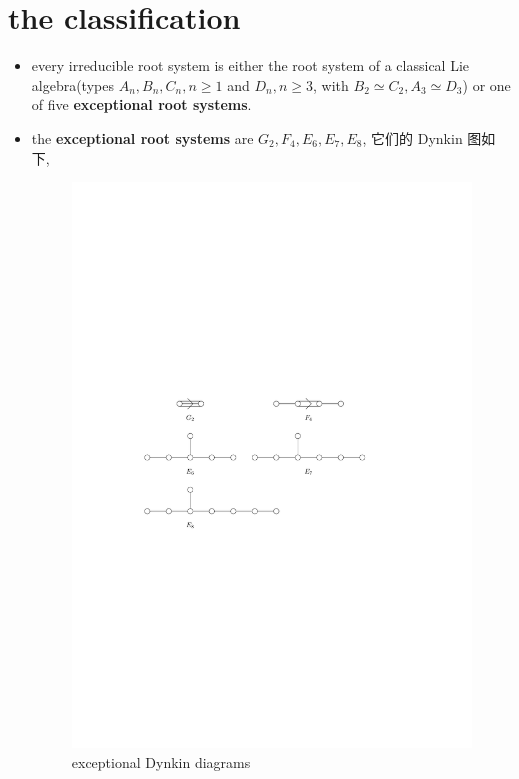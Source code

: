 \section{the classification}
\begin{itemize}
	\item every irreducible root system is either the root system of a classical Lie algebra(types $A_n, B_n, C_n, n \geq 1$ and $D_n, n \geq 3$, with $B_2 \simeq C_2, A_3 \simeq D_3$) or one of five \textbf{exceptional root systems}.
	
	\item the \textbf{exceptional root systems} are $G_2, F_4, E_6, E_7, E_8$, 它们的 Dynkin 图如下,
	
	\begin{figure}[H]
		\centering
		\includegraphics[scale=1]{figures/exceptional Dynkin diagrams.pdf}
		\caption{exceptional Dynkin diagrams}
	\end{figure}
	

\end{itemize}
